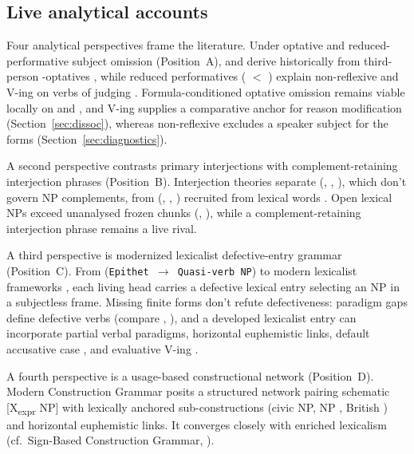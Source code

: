 \documentclass[12pt]{article}
\begin{document}
\subsection{Live analytical accounts}
\label{sec:four-positions}

Four analytical perspectives frame the literature. Under optative and reduced-performative subject omission (Position~A),  and  derive historically from third-person -optatives \citep{huddleston2002,ljung2011,grosz2012}, while reduced performatives ( $<$ ) explain non-reflexive  and  V-ing on verbs of judging \citep{fillmore1971}. Formula-conditioned optative omission remains viable locally on  and , and  V-ing supplies a comparative anchor for reason modification (Section~\ref{sec:dissoc}), whereas non-reflexive  excludes a speaker subject for the  forms (Section~\ref{sec:diagnostics}).

A second perspective contrasts primary interjections with complement-retaining interjection phrases (Position~B). Interjection theories separate  (, , ), which don't govern NP complements, from  (, , ) recruited from lexical words \citep{ameka1992,amekawilkins2006,meinard2015,heine2023interactives}. Open lexical NPs exceed unanalysed frozen chunks (, ), while a complement-retaining interjection phrase \citep[1361 n.\ 70]{huddleston2002,amekawilkins2006} remains a live rival.

A third perspective is modernized lexicalist defective-entry grammar (Position~C). From \textcite[7]{quang1971} (\texttt{Epithet $\to$ Quasi-verb NP}) to modern lexicalist frameworks \citep{mullerwechsler2014}, each living head carries a defective lexical entry selecting an NP in a subjectless frame. Missing finite forms don't refute defectiveness: paradigm gaps define defective verbs (compare , ), and a developed lexicalist entry can incorporate partial verbal paradigms, horizontal euphemistic links, default accusative case \citep{schutze2001}, and evaluative  V-ing \citep{fillmore1971}.

A fourth perspective is a usage-based constructional network (Position~D). Modern Construction Grammar \citep{fillmore1988mechanisms,goldberg1995constructions,goldberg2003,croft2001,bybee2010,diessel2019,goldberg2019,schmid2020} posits a structured network pairing schematic [X\textsubscript{expr} NP] with lexically anchored sub-constructions (civic  NP,  NP , British ) and horizontal euphemistic links. It converges closely with enriched lexicalism (cf.\ Sign-Based Construction Grammar, \citealp{sag2012sign}).
\end{document}
